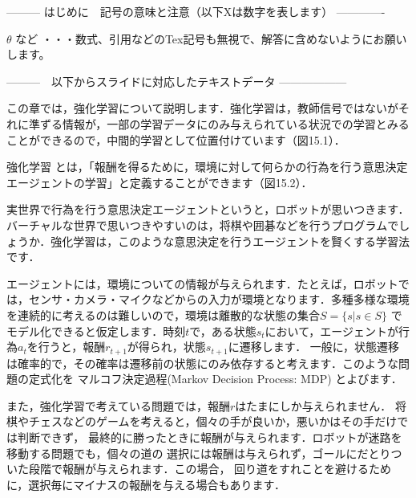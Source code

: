 --------- はじめに　記号の意味と注意（以下Xは数字を表します） -------------

$\theta$ など       ・・・数式、引用などのTex記号も無視で、解答に含めないようにお願いします。
\cite{mitchell97}

---------　以下からスライドに対応したテキストデータ ------------------


この章では，強化学習について説明します．強化学習は，教師信号ではないがそれに準ずる情報が，一部の学習データにのみ与えられている状況での学習とみることができるので，中間的学習として位置付けています（図15.1）．


強化学習
とは，「報酬を得るために，環境に対して何らかの行為を行う意思決定エージェントの学習」と定義することができます（図15.2）．

実世界で行為を行う意思決定エージェントというと，ロボットが思いつきます．
バーチャルな世界で思いつきやすいのは，将棋や囲碁などを行うプログラムでしょうか．強化学習は，このような意思決定を行うエージェントを賢くする学習法です．

エージェントには，環境についての情報が与えられます．たとえば，ロボットでは，センサ・カメラ・マイクなどからの入力が環境となります．多種多様な環境を連続的に考えるのは難しいので，環境は離散的な状態の集合$S=\{s|s \in S\}$
でモデル化できると仮定します．時刻$t$で，ある状態$s_t$において，エージェントが行為$a_t$を行うと，報酬$r_{t+1}$が得られ，状態$s_{t+1}$に遷移します．
一般に，状態遷移は確率的で，その確率は遷移前の状態にのみ依存すると考えます．このような問題の定式化を
マルコフ決定過程(Markov Decision Process: MDP)
とよびます．

また，強化学習で考えている問題では，報酬$r$はたまにしか与えられません．
将棋やチェスなどのゲームを考えると，個々の手が良いか，悪いかはその手だけでは判断できず，
最終的に勝ったときに報酬が与えられます．ロボットが迷路を移動する問題でも，個々の道の
選択には報酬は与えられず，ゴールにだとりついた段階で報酬が与えられます．この場合，
回り道をすれことを避けるために，選択毎にマイナスの報酬を与える場合もあります．

